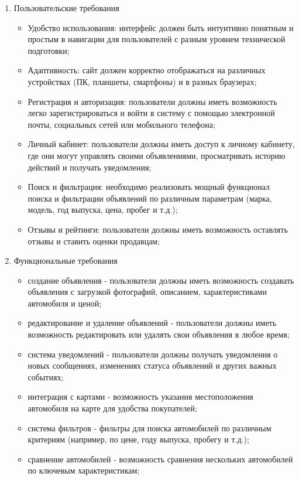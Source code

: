 \begin{enumerate}
    \item Пользовательские требования
        \begin{itemize}
            \item Удобство использования: интерфейс должен быть интуитивно понятным и простым в навигации для пользователей с разным уровнем технической подготовки;
            \item Адаптивность: сайт должен корректно отображаться на различных устройствах (ПК, планшеты, смартфоны) и в разных браузерах;
            \item Регистрация и авторизация: пользователи должны иметь возможность легко зарегистрироваться и войти в систему с помощью электронной почты, социальных сетей или мобильного телефона;
            \item Личный кабинет: пользователи должны иметь доступ к личному кабинету, где они могут управлять своими объявлениями, просматривать историю действий и получать уведомления;
            \item Поиск и фильтрация: необходимо реализовать мощный функционал поиска и фильтрации объявлений по различным параметрам (марка, модель, год выпуска, цена, пробег и т.д.);
            \item Отзывы и рейтинги: пользователи должны иметь возможность оставлять отзывы и ставить оценки продавцам;
        \end{itemize}
    \item Функциональные требования
        \begin{itemize}
            \item создание объявления - пользователи должны иметь возможность создавать объявления с загрузкой фотографий, описанием, характеристиками автомобиля и ценой;
            \item редактирование и удаление объявлений - пользователи должны иметь возможность редактировать или удалять свои объявления в любое время;
            \item система уведомлений - пользователи должны получать уведомления о новых сообщениях, изменениях статуса объявлений и других важных событиях;
            \item интеграция с картами - возможность указания местоположения автомобиля на карте для удобства покупателей;
            \item система фильтров - фильтры для поиска автомобилей по различным критериям (например, по цене, году выпуска, пробегу и т.д.);
            \item сравнение автомобилей - возможность сравнения нескольких автомобилей по ключевым характеристикам;

\end{itemize}
\end{enumerate}
